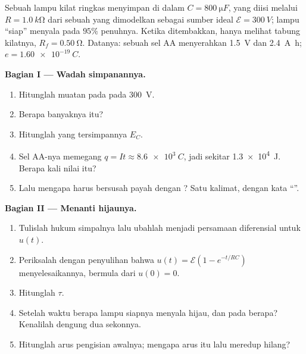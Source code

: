 \begin{problem}
\label{pb:g12:rc-rl-circuits:1}
Sebuah lampu kilat ringkas menyimpan  di dalam 
$C = \qty{800}{\micro F}$, yang diisi melalui $R = \qty{1.0}{k\ohm}$ dari
sebuah  yang dimodelkan sebagai sumber ideal $\mathcal{E} = \qty{300}{V}$;
lampu ``siap'' menyala pada $95\%$  penuhnya. Ketika ditembakkan,
 hanya melihat tabung kilatnya, $R_f = \qty{0.50}{\ohm}$. Datanya: sebuah
sel AA menyerahkan \qty{1.5}{V} dan \qty{2.4}{A.h}; $e = \qty{1.60e-19}{C}$.

\medskip
\noindent\textbf{Bagian I --- Wadah simpanannya.}
\begin{enumerate}
  \item Hitunglah muatan pada  pada \qty{300}{V}.
  \item Berapa  banyaknya itu?
  \item Hitunglah  yang tersimpannya $E_C$.
  \item Sel AA-nya memegang $q = It \approx \qty{8.6e3}{C}$, jadi sekitar
        \qty{1.3e4}{J}. Berapa kali   nilai itu?
  \item Lalu mengapa harus bersusah payah dengan ? Satu kalimat, dengan kata ``''.
\end{enumerate}

\medskip
\noindent\textbf{Bagian II --- Menanti hijaunya.}
\begin{enumerate}[resume]
  \item Tulislah hukum simpalnya lalu ubahlah menjadi persamaan diferensial
        untuk $u(t)$.
  \item Periksalah dengan penyulihan bahwa $u(t) = \mathcal{E}(1 - e^{-t/RC})$
        menyelesaikannya, bermula dari $u(0) = 0$.
  \item Hitunglah  $\tau$.
  \item Setelah waktu berapa lampu siapnya menyala hijau, dan pada 
        berapa? Kenalilah dengung dua sekonnya.
  \item Hitunglah arus pengisian awalnya; mengapa arus itu lalu meredup
        hilang?
\end{enumerate}


\end{problem}
